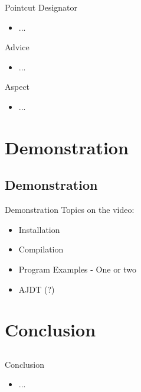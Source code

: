 \documentclass[11pt]{beamer}
\begin{document}
\begin{frame}{Pointcut Designator}
\begin{itemize}
\item ...
\end{itemize}
\end{frame}

\begin{frame}{Advice}
\begin{itemize}
\item ...
\end{itemize}
\end{frame}

\begin{frame}{Aspect}
\begin{itemize}
\item ...
\end{itemize}
\end{frame}

\section{Demonstration}
\subsection*{Demonstration}

\begin{frame}{Demonstration}
Topics on the video:
\begin{itemize}
\item Installation
\item Compilation
\item Program Examples - One or two
\item AJDT (?)
\end{itemize}
\end{frame}


\section{Conclusion}
\subsection*{}
\begin{frame}{Conclusion}
\begin{itemize}
\item ...
\end{itemize}
\end{frame}

\section*{}
\frame{\titlepage}

\end{document}
